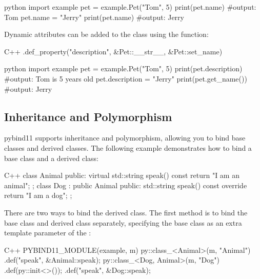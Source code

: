 \begin{neonlisting}{python}
    import example
    pet = example.Pet("Tom", 5)
    print(pet.name) #output: Tom
    pet.name = "Jerry"
    print(pet.name) #output: Jerry
\end{neonlisting}

Dynamic attributes can be added to the class using the  function:

\begin{neonlisting}[language=C++]{C++}
    .def_property("description", &Pet::__str__, &Pet::set_name)
\end{neonlisting}

\begin{neonlisting}{python}
    import example
    pet = example.Pet("Tom", 5)
    print(pet.description) #output: Tom is 5 years old
    pet.description = "Jerry"
    print(pet.get_name()) #output: Jerry
\end{neonlisting}

\subsection{Inheritance and Polymorphism}

pybind11 supports inheritance and polymorphism, allowing you to bind base classes and derived classes. The following example demonstrates how to bind a base class and a derived class:

\begin{neonlisting}[language=C++]{C++}
    class Animal {
    public:
        virtual std::string speak() const {
            return "I am an animal";
        }
    };
    class Dog : public Animal {
    public:
        std::string speak() const override {
            return "I am a dog";
        }
    };
\end{neonlisting}

There are two ways to bind the derived class. The first method is to bind the base class and derived class separately, specifying the base class as an extra template parameter of the :

\begin{neonlisting}[language=C++]{C++}
    PYBIND11_MODULE(example, m) {
        py::class_<Animal>(m, "Animal")
            .def("speak", &Animal::speak);
        py::class_<Dog, Animal>(m, "Dog")
            .def(py::init<>());
            .def("speak", &Dog::speak);
    }
\end{neonlisting}

